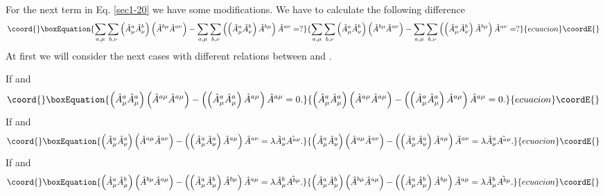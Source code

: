 \documentclass[a4paper,a4paper]{article}
\begin{document}
For the next term 
\coordHE{}
in Eq. \eqref{sec1-20} we have some modifications. We have to calculate 
the following difference 
\begin{equation}\coord{}\boxEquation{
  \sum_{a, \mu} \sum_{b, \nu}
  \left(
  \hat{A}^a_\mu \hat{A}^b_\nu
  \right) 
  \left( 
  \hat{A}^{b \mu} \hat{A}^{a \nu} 
  \right) - 
  \sum_{a, \mu} \sum_{b, \nu} 
  \left( \left( \hat{A}^a_\mu \hat{A}^b_\nu 
  \right) \hat{A}^{b \mu} \right) \hat{A}^{a \nu} = ? 
\label{sec4-15}
}{
  \sum_{a, \mu} \sum_{b, \nu}
  \left(
  \hat{A}^a_\mu \hat{A}^b_\nu
  \right) 
  \left( 
  \hat{A}^{b \mu} \hat{A}^{a \nu} 
  \right) - 
  \sum_{a, \mu} \sum_{b, \nu} 
  \left( \left( \hat{A}^a_\mu \hat{A}^b_\nu 
  \right) \hat{A}^{b \mu} \right) \hat{A}^{a \nu} = ? 
}{ecuacion}\coordE{}\end{equation}
At first we will consider the next cases with different relations 
between \coordHE{} and \myHighlight{$\nu , \mu$}\coordHE{}.
\par
\noindent
If \coordHE{} and \myHighlight{$\nu = \mu$}\coordHE{} 
\begin{equation}\coord{}\boxEquation{
\left (
\hat A^a_\mu \hat A^a_\mu
\right )
\left (
\hat A^{a\mu} \hat A^{a\mu}
\right ) - 
\left (
  \left (
  \hat A^a_\mu \hat A^a_\mu
  \right ) \hat A^{a\mu}
\right ) \hat A^{a\mu} = 0 .  
\label{sec4-40a}
}{
\left (
\hat A^a_\mu \hat A^a_\mu
\right )
\left (
\hat A^{a\mu} \hat A^{a\mu}
\right ) - 
\left (
  \left (
  \hat A^a_\mu \hat A^a_\mu
  \right ) \hat A^{a\mu}
\right ) \hat A^{a\mu} = 0 .  
}{ecuacion}\coordE{}\end{equation}
If \coordHE{} and \myHighlight{$\nu \neq \mu$}\coordHE{} 
\begin{equation}\coord{}\boxEquation{
\left (
\hat A^a_\mu \hat A^a_\nu
\right )
\left (
\hat A^{a\mu} \hat A^{a\nu}
\right ) - 
\left (
  \left (
  \hat A^a_\mu \hat A^a_\nu
  \right ) \hat A^{a\mu}
\right ) \hat A^{a\nu} = 
\lambda \hat{A}^a_\nu \hat{A^{a \nu}} . 
\label{sec4-40b}
}{
\left (
\hat A^a_\mu \hat A^a_\nu
\right )
\left (
\hat A^{a\mu} \hat A^{a\nu}
\right ) - 
\left (
  \left (
  \hat A^a_\mu \hat A^a_\nu
  \right ) \hat A^{a\mu}
\right ) \hat A^{a\nu} = 
\lambda \hat{A}^a_\nu \hat{A^{a \nu}} . 
}{ecuacion}\coordE{}\end{equation}
If \coordHE{} and \myHighlight{$\nu = \mu$}\coordHE{} 
\begin{equation}\coord{}\boxEquation{
\left (
\hat A^a_\mu \hat A^b_\mu
\right )
\left (
\hat A^{b\mu} \hat A^{a\mu}
\right ) - 
\left (
  \left (
  \hat A^a_\mu \hat A^b_\mu
  \right ) \hat A^{b\mu}
\right ) \hat A^{a\mu} = 
\lambda \hat{A}^b_\mu \hat{A^{b \mu}} . 
\label{sec4-40c}
}{
\left (
\hat A^a_\mu \hat A^b_\mu
\right )
\left (
\hat A^{b\mu} \hat A^{a\mu}
\right ) - 
\left (
  \left (
  \hat A^a_\mu \hat A^b_\mu
  \right ) \hat A^{b\mu}
\right ) \hat A^{a\mu} = 
\lambda \hat{A}^b_\mu \hat{A^{b \mu}} . 
}{ecuacion}\coordE{}\end{equation}
\end{document}
